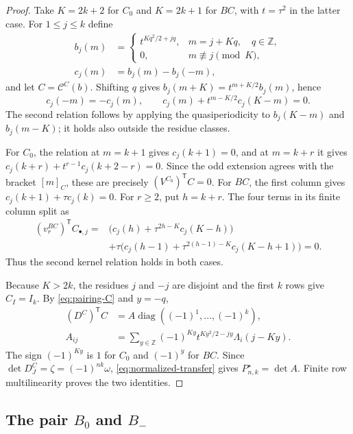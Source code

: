 \documentclass[12pt]{article}
\numberwithin{equation}{section}
\newcommand{\Z}{\mathbb Z}
\newcommand{\diag}{\operatorname{diag}}
\begin{document}
\begin{proof}
Take $K=2k+2$ for $C_0$ and $K=2k+1$ for $BC$, with $t=\tau^2$
in the latter case.  For $1\le j\le k$ define
\[
\begin{aligned}
 b_j(m)&=
 \begin{cases}
 t^{Kq^2/2+jq},&m=j+Kq,\quad q\in\Z,\\
 0,&m\not\equiv j\pmod K,
 \end{cases}\\
 c_j(m)&=b_j(m)-b_j(-m),
\end{aligned}
\]
and let $C=\mathcal C^C(b)$.  Shifting $q$ gives
$b_j(m+K)=t^{m+K/2}b_j(m)$, hence
\begin{equation}\label{eq:ordinary-C-reflection}
 c_j(-m)=-c_j(m),\qquad
 c_j(m)+t^{m-K/2}c_j(K-m)=0.
\end{equation}
The second relation follows by applying the quasiperiodicity to
$b_j(K-m)$ and $b_j(m-K)$; it holds also outside the residue classes.

For $C_0$, the relation at $m=k+1$ gives $c_j(k+1)=0$, and at
$m=k+r$ it gives
$c_j(k+r)+t^{r-1}c_j(k+2-r)=0$.  Since the odd extension agrees with
the bracket $[m]_C$, these are precisely
$(V^{C_0})^{\mathsf T}C=0$.
For $BC$, the first column gives
$c_j(k+1)+\tau c_j(k)=0$.
For $r\ge2$, put $h=k+r$.  The four terms in its finite column split as
\begin{align*}
 (v_r^{BC})^{\mathsf T}C_{\bullet,j}
 ={}&\bigl(c_j(h)+\tau^{2h-K}c_j(K-h)\bigr)\\
 &+\tau\bigl(c_j(h-1)+\tau^{2(h-1)-K}c_j(K-h+1)\bigr)=0.
\end{align*}
Thus the second kernel relation holds in both cases.

Because $K>2k$, the residues $j$ and $-j$ are disjoint and the first
$k$ rows give $C_I=I_k$.  By \eqref{eq:pairing-C} and $y=-q$,
\[
\begin{aligned}
 (D^C)^{\mathsf T}C&=A\diag((-1)^1,\ldots,(-1)^k),\\
 A_{ij}&=\sum_{y\in\Z}(-1)^{Ky}t^{Ky^2/2-jy}\Lambda_i(j-Ky).
\end{aligned}
\]
The sign $(-1)^{Ky}$ is $1$ for $C_0$ and $(-1)^y$ for $BC$.
Since $\det D^C_J=\zeta=(-1)^{nk}\omega$,
\eqref{eq:normalized-transfer} gives $P^\star_{n,k}=\det A$.
Finite row multilinearity proves the two identities.
\end{proof}

\subsection{The pair \texorpdfstring{$B_0$ and $B_-$}{B0 and B-}}
\end{document}
